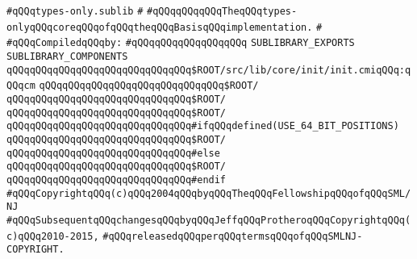 \label{src/lib/std/types-only/types-only.sublib}
\verb|#qQQqtypes-only.sublib|\newline
\verb|#|\newline
\verb|#qQQqqQQqqQQqTheqQQqtypes-onlyqQQqcoreqQQqofqQQqtheqQQqBasisqQQqimplementation.|\newline
\verb|#|\newline
\newline
\verb|#qQQqCompiledqQQqby:|\newline
\verb|#qQQqqQQqqQQqqQQqqQQq|\newline
\newline
\verb|SUBLIBRARY_EXPORTS|\newline
\newline
\verb|SUBLIBRARY_COMPONENTS|\newline
\newline
\verb|qQQqqQQqqQQqqQQqqQQqqQQqqQQqqQQq$ROOT/src/lib/core/init/init.cmiqQQq:qQQqcm|\newline
\newline
\verb|qQQqqQQqqQQqqQQqqQQqqQQqqQQqqQQq$ROOT/|\newline
\verb|qQQqqQQqqQQqqQQqqQQqqQQqqQQqqQQq$ROOT/|\newline
\verb|qQQqqQQqqQQqqQQqqQQqqQQqqQQqqQQq$ROOT/|\newline
\newline
\verb|qQQqqQQqqQQqqQQqqQQqqQQqqQQqqQQq#ifqQQqdefined(USE_64_BIT_POSITIONS)|\newline
\verb|qQQqqQQqqQQqqQQqqQQqqQQqqQQqqQQq$ROOT/|\newline
\verb|qQQqqQQqqQQqqQQqqQQqqQQqqQQqqQQq#else|\newline
\verb|qQQqqQQqqQQqqQQqqQQqqQQqqQQqqQQq$ROOT/|\newline
\verb|qQQqqQQqqQQqqQQqqQQqqQQqqQQqqQQq#endif|\newline
\newline
\newline
\verb|#qQQqCopyrightqQQq(c)qQQq2004qQQqbyqQQqTheqQQqFellowshipqQQqofqQQqSML/NJ|\newline
\verb|#qQQqSubsequentqQQqchangesqQQqbyqQQqJeffqQQqProtheroqQQqCopyrightqQQq(c)qQQq2010-2015,|\newline
\verb|#qQQqreleasedqQQqperqQQqtermsqQQqofqQQqSMLNJ-COPYRIGHT.|\newline


